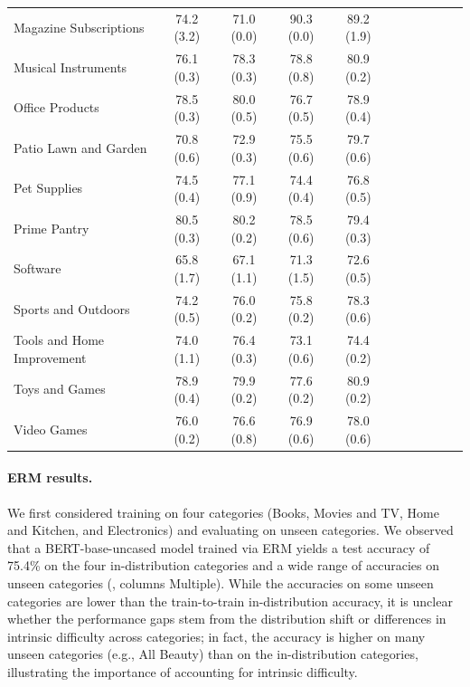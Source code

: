 \begin{table}[tbp]
\begin{small}
\begin{tabular}{lcccccccccc}
  Magazine Subscriptions & 74.2 (3.2) & 71.0 (0.0) & 90.3 (0.0) & 89.2 (1.9) \\
  Musical Instruments & 76.1 (0.3) & 78.3 (0.3) & 78.8 (0.8) & 80.9 (0.2) \\
  Office Products & 78.5 (0.3) & 80.0 (0.5) & 76.7 (0.5) & 78.9 (0.4) \\
  Patio Lawn and Garden & 70.8 (0.6) & 72.9 (0.3) & 75.5 (0.6) & 79.7 (0.6) \\
  Pet Supplies & 74.5 (0.4) & 77.1 (0.9) & 74.4 (0.4) & 76.8 (0.5) \\
  Prime Pantry & 80.5 (0.3) & 80.2 (0.2) & 78.5 (0.6) & 79.4 (0.3) \\
  Software & 65.8 (1.7) & 67.1 (1.1) & 71.3 (1.5) & 72.6 (0.5) \\
  Sports and Outdoors & 74.2 (0.5) & 76.0 (0.2) & 75.8 (0.2) & 78.3 (0.6) \\
  Tools and Home Improvement & 74.0 (1.1) & 76.4 (0.3) & 73.1 (0.6) & 74.4 (0.2) \\
  Toys and Games & 78.9 (0.4) & 79.9 (0.2) & 77.6 (0.2) & 80.9 (0.2) \\
  Video Games & 76.0 (0.2) & 76.6 (0.8) & 76.9 (0.6) & 78.0 (0.6) \\
  \bottomrule
  \end{tabular}
  \end{small}
\end{table}

\paragraph{ERM results.}
We first considered training on four categories (Books, Movies and TV, Home and Kitchen, and Electronics) and evaluating on unseen categories.
We observed that a BERT-base-uncased model trained via ERM yields a test accuracy of 75.4\% on the four in-distribution categories and a wide range of accuracies on unseen categories (, columns Multiple).
While the accuracies on some unseen categories are lower than the train-to-train in-distribution accuracy, it is unclear whether the performance gaps stem from the distribution shift or differences in intrinsic difficulty across categories;
in fact, the accuracy is higher on many unseen categories (e.g., All Beauty) than on the in-distribution categories, illustrating the importance of accounting for intrinsic difficulty.

